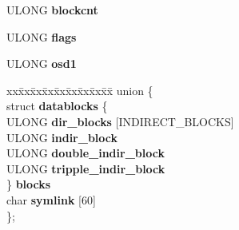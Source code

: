 \begin{DoxyCompactItemize}
U\+L\+O\+NG {\bfseries blockcnt}
\item 
\mbox{\label{structext2__inode_a87f58755dca55fe331788f424c9780cd}} 
U\+L\+O\+NG {\bfseries flags}
\item 
\mbox{\label{structext2__inode_ad9de9fdb049fa8371ac55bc61440998d}} 
U\+L\+O\+NG {\bfseries osd1}
\item 
\mbox{\label{structext2__inode_a34c5351005ba23a31cd92a6d77536b97}} 
\begin{tabbing}
xx\=xx\=xx\=xx\=xx\=xx\=xx\=xx\=xx\=\kill
union \{\\
\>struct {\bfseries datablocks} \{\\
\>\>ULONG {\bfseries dir\_blocks} \mbox{[}INDIRECT\_BLOCKS\mbox{]}\\
\>\>ULONG {\bfseries indir\_block}\\
\>\>ULONG {\bfseries double\_indir\_block}\\
\>\>ULONG {\bfseries tripple\_indir\_block}\\
\>\} {\bfseries blocks}\\
\>char {\bfseries symlink} \mbox{[}60\mbox{]}\\
\}; \\


\end{tabbing}
\end{DoxyCompactItemize}
